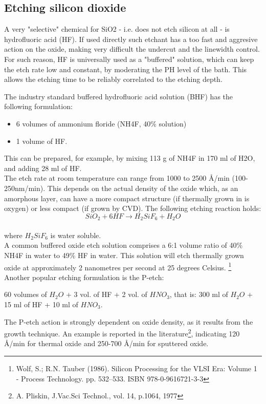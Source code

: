 \subsection{Etching silicon dioxide}
A very "selective" chemical for SiO2 - i.e. does not etch silicon at all - is hydrofluoric acid (HF). If used directly such etchant has a too fast and aggresive action on the oxide, making very difficult the undercut and the linewidth control. For such reason, HF is universally used as a "buffered" solution, which can keep the etch rate low and constant, by moderating the PH level of the bath. This allows the etching time to be reliably correlated to the etching depth.

The industry standard buffered hydrofluoric acid solution (BHF\label{BHF}) has the following formulation:
\begin{itemize}
	\item 6 volumes of ammonium floride (NH4F, 40\% solution)
	\item 1 volume of HF.
\end{itemize}
This can be prepared, for example, by mixing 113 g of NH4F in 170 ml of H2O, and adding 28 ml of HF.\\
The etch rate at room temperature can range from 1000 to 2500 Å/min (100-250nm/min).
This depends on the actual density of the oxide which, as an amorphous layer, can have a more compact structure (if thermally grown in is oxygen) or less compact (if grown by CVD).
The following etching reaction holds:
\begin{equation}
	SiO_2 + 6HF \rightarrow H_2SiF_6 + H_2O
\end{equation}\\
where $H_2SiF_6$ is water soluble.\\
A common buffered oxide etch solution comprises a 6:1 volume ratio of 40\% NH4F in water to 49\% HF in water. This solution will etch thermally grown oxide at approximately 2 nanometres per second at 25 degrees Celsius.\label{BHF_six_to_one}
\footnote{Wolf, S.; R.N. Tauber (1986). Silicon Processing for the VLSI Era: Volume 1 - Process Technology. pp. 532–533. ISBN 978-0-9616721-3-3} \\

Another popular etching formulation is the P-etch:

60 volumes of $H_2O$ + 3 vol. of HF + 2 vol. of $HNO_3$, that is: 300 ml of $H_2O$ + 15 ml of HF + 10 ml of $HNO_3$.

The P-etch action is strongly dependent on oxide density, as it results from the growth technique.
An example is reported in the literature\footnote{A. Pliskin, J.Vac.Sci Technol., vol. 14, p.1064, 1977}, indicating 120 Å/min for thermal oxide and 250-700 Å/min for sputtered oxide.

